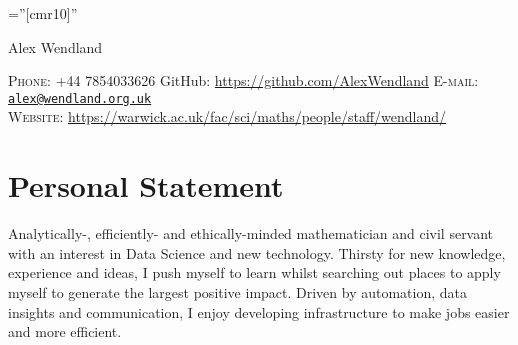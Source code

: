 \documentclass[a4paper,10pt]{article}
\begin{document}

\pagestyle{empty} %

\font\fb=''[cmr10]'' %

\par{\centering
		{\Huge Alex Wendland
	}\bigskip\par}
\vspace{-0.3 cm}
\begin{center}
	\textsc{Phone:} +44 7854033626 \hspace{1cm} GitHub: \href{https://github.com/AlexWendland}{https://github.com/AlexWendland} \hspace{1cm} \textsc{E-mail:} \href{mailto:alex@wendland.org.uk}{\texttt{alex@wendland.org.uk}}\\
	\textsc{Website:} \href{https://warwick.ac.uk/fac/sci/maths/people/staff/wendland/}{https://warwick.ac.uk/fac/sci/maths/people/staff/wendland/}
\end{center}


\section{Personal Statement}
Analytically-, efficiently- and ethically-minded mathematician and civil servant with an interest in Data Science and new technology. Thirsty for new knowledge, experience and ideas, I push myself to learn whilst searching out places to apply myself to generate the largest positive impact. Driven by automation, data insights and communication, I enjoy developing infrastructure to make jobs easier and more efficient.
\end{document}
